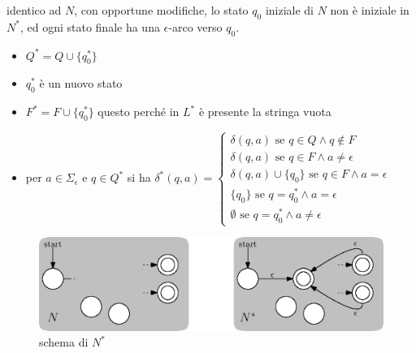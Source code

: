 \documentclass[10pt, letterpaper]{report}
\begin{document}
 identico ad $N$, con opportune 
modifiche, lo stato $q_0$ iniziale di $N$ non è iniziale in $N^*$, 
ed ogni stato finale ha una $\epsilon$-arco verso $q_0$.\begin{itemize}
    \item $Q^*=Q\cup\{q_0^*\}$
    \item $q_0^*$ è un nuovo stato 
    \item $F^*=F\cup\{q_0^*\}$ questo perché in $L^*$ è presente la stringa vuota
    \item per $a\in\Sigma_\epsilon$ e $q\in Q^*$ si ha $\delta^*(q,a)=\begin{cases}
        \delta(q,a) \text{ se }q\in Q\land q\notin F\\ 
        \delta(q,a) \text{ se }q\in F\land a\ne \epsilon\\
        \delta(q,a)\cup\{q_0\} \text{ se }q\in F\land a= \epsilon\\
        \{q_0\}\text{ se }q=q_0^*\land a =\epsilon\\ 
        \emptyset \text{ se }q=q_0^*\land a\ne \epsilon
    \end{cases}$
\end{itemize}
\begin{center}
    \begin{figure}[h!]
        \centering 
        \includegraphics[width=1\textwidth ]{images/starChiusa.eps}
        \caption{schema di $N^*$}
        \label{fig:starChiusa}
    \end{figure}
\end{center}
\flowerLine 
\end{document}
